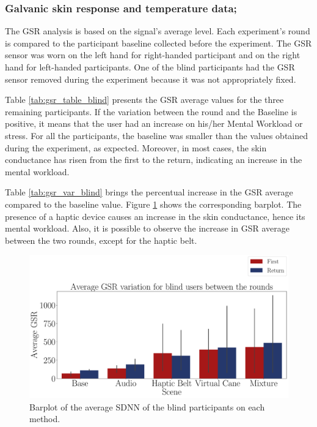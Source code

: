 \subsubsection{Galvanic skin response and temperature data;}
\label{subsubsec:results_gsr_temp_1}

The GSR analysis is based on the signal's average level. Each experiment's round is compared to the participant baseline collected before the experiment. The GSR sensor was worn on the left hand for right-handed participant and on the right hand for left-handed participants. One of the blind participants had the GSR sensor removed during the experiment because it was not appropriately fixed.

Table \ref{tab:gsr_table_blind} presents the GSR average values for the three remaining participants. If the variation between the round and the Baseline is positive, it means that the user had an increase on his/her Mental Workload or stress. For all the participants, the baseline was smaller than the values obtained during the experiment, as expected. Moreover, in most cases, the skin conductance has risen from the first to the return, indicating an increase in the mental workload.



Table \ref{tab:gsr_var_blind} brings the percentual increase in the GSR average compared to the baseline value. Figure \ref{fig:barplot_gsr_avg_5_scene_blind} shows the corresponding barplot. The presence of a haptic device causes an increase in the skin conductance, hence its mental workload. Also, it is possible to observe the increase in GSR average between the two rounds, except for the haptic belt.



\begin{figure}[!htb]
    \centering
    \includegraphics[width = \textwidth]{Resultados/GSR/Figuras/pdf/barplot_gsr_avg_5_scene_blind.pdf}
    \caption{Barplot of the average SDNN of the blind participants on each method.}
    \label{fig:barplot_gsr_avg_5_scene_blind}
\end{figure}

